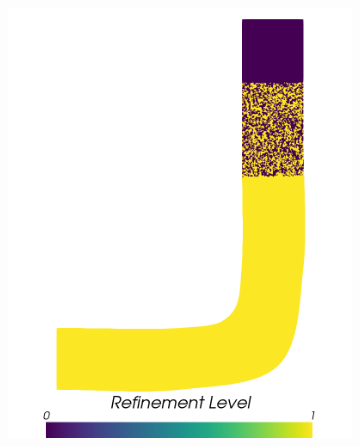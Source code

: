 \begin{figure}[H]
\begin{subfigure}{0.3\linewidth}
		\includegraphics[scale=0.18]{figs/pipe/euler2D_pipe_adipm_n1-2_refinementLevel.png}
		\caption{}
		\label{fig:adIPMSolutionsPipeSGRI}
	\end{subfigure}\\
	\begin{subfigure}{0.3\linewidth}
		\centering

\end{subfigure}
\end{figure}
